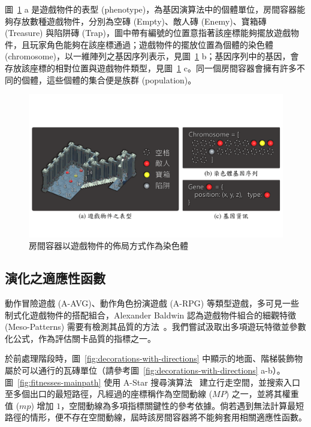 圖~\ref{fig:segments-gene-expression} a 是遊戲物件的表型 (phenotype)，為基因演算法中的個體單位，房間容器能夠存放數種遊戲物件，分別為空磚 (Empty)、敵人磚 (Enemy)、寶箱磚 (Treasure) 與陷阱磚 (Trap)，圖中帶有編號的位置意指著該座標能夠擺放遊戲物件，且玩家角色能夠在該座標通過；遊戲物件的擺放位置為個體的染色體 (chromosome)，以一維陣列之基因序列表示，見圖~\ref{fig:segments-gene-expression} b；基因序列中的基因，會存放該座標的相對位置與遊戲物件類型，見圖~\ref{fig:segments-gene-expression} c。同一個房間容器會擁有許多不同的個體，這些個體的集合便是族群 (population)。

\begin{figure}[!htb]
  \begin{center}
    \includegraphics[width=1.0\textwidth]{figures/segments-gene-expression.pdf}
    \caption{房間容器以遊戲物件的佈局方式作為染色體}
    \label{fig:segments-gene-expression}
  \end{center}
\end{figure}

\subsection{演化之適應性函數}
\label{ssec:method-segments-fitnesses}

動作冒險遊戲 (A-AVG)、動作角色扮演遊戲 (A-RPG) 等類型遊戲，多可見一些制式化遊戲物件的搭配組合，Alexander Baldwin 認為遊戲物件組合的細觀特徵 (Meso-Patterns) 需要有檢測其品質的方法~\cite{baldwin2017mixed}。我們嘗試汲取出多項遊玩特徵並參數化公式，作為評估關卡品質的指標之一。

於前處理階段時，圖~\ref{fig:decorations-with-directions} 中顯示的地面、階梯裝飾物屬於可以通行的瓦磚單位（請參考圖~\ref{fig:decorations-with-directions} a-b）。圖~\ref{fig:fitnesses-mainpath} 使用 A-Star 搜尋演算法~\cite{hart1968formal} 建立行走空間，並搜索入口至多個出口的最短路徑，凡經過的座標稱作為空間動線 ($MP$) 之一，並將其權重值 ($mp$) 增加 $1$，空間動線為多項指標關鍵性的參考依據。倘若遇到無法計算最短路徑的情形，便不存在空間動線，屆時該房間容器將不能夠套用相關適應性函數。

